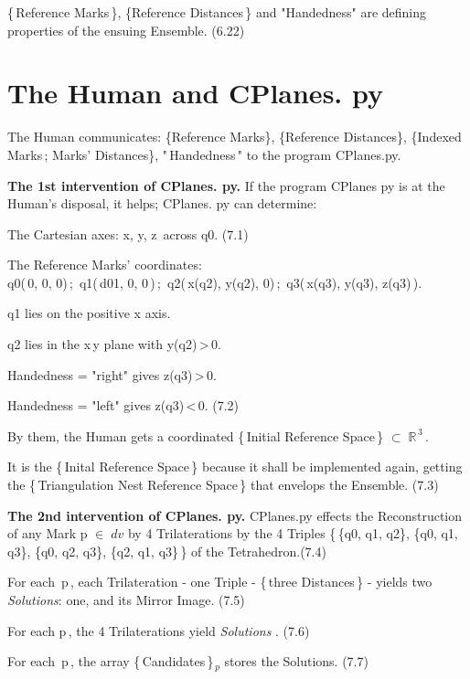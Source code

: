 \documentclass[12pt]{article} %
\begin{document}
{\noindent \{\,Reference Marks\,\}, \{Reference Distances\,\} and "Handedness" are defining properties of the ensuing Ensemble. \qquad \qquad (6.22)

\section{The Human and CPlanes. py}  

\noindent The Human communicates: \{Reference Marks\}, \{Reference Distances\}, \{Indexed Marks\,; Marks' Distances\}, "\,Handedness\," to the program CPlanes.py. 

\noindent \textbf{The 1st intervention of CPlanes. py.} If the program CPlanes py is at the Human's disposal, it helps; CPlanes. py can determine:

\noindent The Cartesian axes:\; x, y, z\,  across q0. \qquad \qquad \qquad (7.1)

\noindent The Reference Marks' coordinates:\\q0(\,0, 0, 0)\,;\, q1(\,d01, 0, 0\,)\,;\, q2(\,x(q2), y(q2), 0)\,;\, q3(\,x(q3), y(q3), z(q3)\,).

\noindent q1 lies on the positive x axis.

\noindent q2 lies in the x\,y plane with y(q2)\,>\,0.

\noindent Handedness = "right" gives z(q3)\,>\,0.

\noindent Handedness = "left" gives z(q3)\,<\,0. \qquad (7.2)

\noindent By them, the Human gets a coordinated \{\,Initial Reference Space\,\} $\subset\;\mathbb{R}^{\,3}$\,.  

\noindent It is the \{\,Inital Reference Space\,\} because it shall be implemented again, getting the \{\,Triangulation Nest Reference Space\,\} that envelops the Ensemble. (7.3)

\noindent \textbf{The 2nd intervention of CPlanes. py.} CPlanes.py effects the Reconstruction of any Mark p $\in\;dv$ by 4 Trilaterations by the 4 Triples \big\{\,\{q0, q1, q2\}, \{q0, q1, q3\}, \{q0, q2, q3\}, \{q2, q1, q3\}\,\big\} of the Tetrahedron.\qquad (7.4)

\noindent For each \,p\,, each Trilateration - one Triple - \{\,three Distances\,\} - yields two \textsl{Solutions}:\; one, and its Mirror Image. \qquad (7.5)

\noindent For each p\,, the 4 Trilaterations yield \textsl{Solutions} . \qquad (7.6)

\noindent For each \,p\,, the array \{\,Candidates\,\}$_{\,p}$ stores the Solutions. \qquad (7.7)

}
\end{document}
